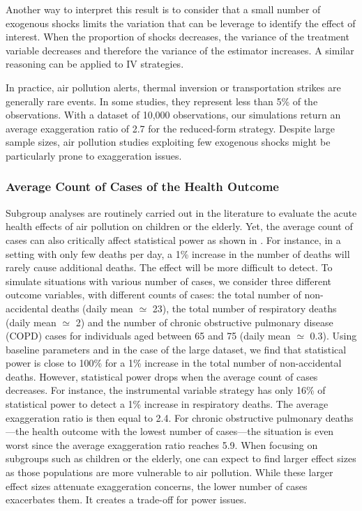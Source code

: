 \documentclass[12pt]{article}
\begin{document}
            Another way to interpret this result is to consider that a small number of exogenous shocks limits the variation that can be leverage to identify the effect of interest. When the proportion of shocks decreases, the variance of the treatment variable decreases and therefore the variance of the estimator increases. A similar reasoning can be applied to IV strategies.

            \begin{sloppypar}
            In practice, air pollution alerts, thermal inversion or transportation strikes are generally rare events. In some studies, they represent less than 5\% of the observations. With a dataset of 10,000 observations, our simulations return an average exaggeration ratio of 2.7 for the reduced-form strategy. Despite large sample sizes, air pollution studies exploiting few exogenous shocks might be particularly prone to exaggeration issues.
            \end{sloppypar}
            
        \subsubsection*{Average Count of Cases of the Health Outcome}
    
            

            Subgroup analyses are routinely carried out in the literature to evaluate the acute health effects of air pollution on children or the elderly. Yet, the average count of cases can also critically affect statistical power as shown in . For instance, in a setting with only few deaths per day, a 1\% increase in the number of deaths will rarely cause additional deaths. The effect will be more difficult to detect. To simulate situations with various number of cases, we consider three different outcome variables, with different counts of cases: the total number of non-accidental deaths (daily mean $\simeq$ 23), the total number of respiratory deaths (daily mean $\simeq$ 2) and the number of chronic obstructive pulmonary disease (COPD) cases for individuals aged between 65 and 75 (daily mean $\simeq$ 0.3). Using baseline parameters and in the case of the large dataset, we find that statistical power is close to 100\% for a 1\% increase in the total number of non-accidental deaths. However, statistical power drops when the average count of cases decreases. For instance, the instrumental variable strategy has only 16\% of statistical power to detect a 1\% increase in respiratory deaths. The average exaggeration ratio is then equal to 2.4. For chronic obstructive pulmonary deaths---the health outcome with the lowest number of cases---the situation is even worst since the average exaggeration ratio reaches 5.9. When focusing on subgroups such as children or the elderly, one can expect to find larger effect sizes as those populations are more vulnerable to air pollution. While these larger effect sizes attenuate exaggeration concerns, the lower number of cases exacerbates them. It creates a trade-off for power issues.
\end{document}
